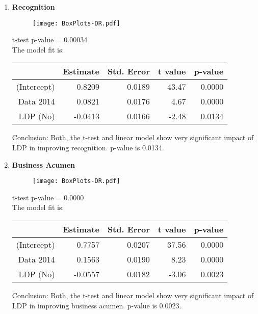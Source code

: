 \documentclass[11pt]{extarticle} %
\begin{document}
\begin{enumerate}
\item {\bf{Recognition}}\\
\begin{minipage}[t]{0.3\textwidth}
\begin{figure}[H]
\centering 
\texttt{[image: BoxPlots-DR.pdf]}
\end{figure}
\end{minipage}
\begin{minipage}[t]{0.6\textwidth}
\vspace{0.8cm}
t-test p-value = 0.00034 \\
The model fit is:
\begin{table}[H]
\centering
\begin{tabular}{rrrrr}
  \hline
 & Estimate & Std. Error & t value & p-value \\ 
  \hline
(Intercept) & 0.8209 & 0.0189 & 43.47 & 0.0000 \\ 
  Data 2014 & 0.0821 & 0.0176 & 4.67 & 0.0000 \\ 
  LDP (No) & -0.0413 & 0.0166 & -2.48 & 0.0134 \\ 
  \hline
\end{tabular}
\end{table}
Conclusion: Both, the t-test and linear model show very significant impact of LDP in improving recognition. p-value is 0.0134. 
\end{minipage}

\item {\bf{Business Acumen}}\\
\begin{minipage}[t]{0.3\textwidth}
\begin{figure}[H]
\centering 
\texttt{[image: BoxPlots-DR.pdf]}
\end{figure}
\end{minipage}
\begin{minipage}[t]{0.6\textwidth}
\vspace{0.8cm}
t-test p-value = 0.0000 \\
The model fit is:
\begin{table}[H]
\centering
\begin{tabular}{rrrrr}
  \hline
 & Estimate & Std. Error & t value & p-value \\ 
  \hline
(Intercept) & 0.7757 & 0.0207 & 37.56 & 0.0000 \\ 
  Data 2014 & 0.1563 & 0.0190 & 8.23 & 0.0000 \\ 
  LDP (No) & -0.0557 & 0.0182 & -3.06 & 0.0023 \\ 
   \hline
\end{tabular}
\end{table}
Conclusion: Both, the t-test and linear model show very significant impact of LDP in improving business acumen. p-value is 0.0023. 
\end{minipage}


\end{enumerate}
\end{document}
